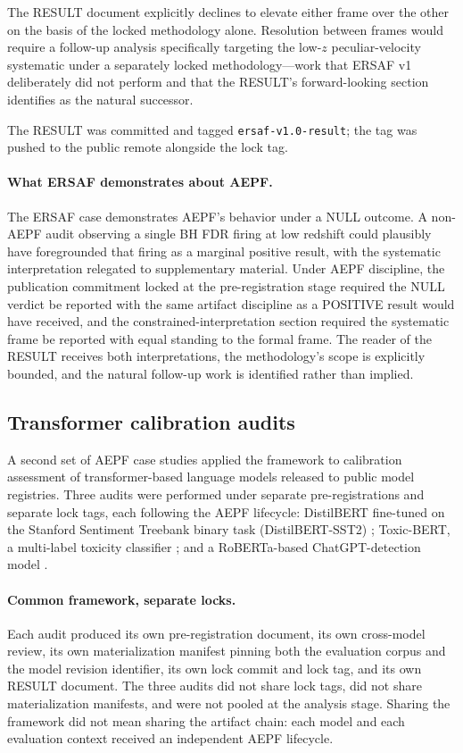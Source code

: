 \documentclass[11pt]{article}
\begin{document}
The RESULT document explicitly declines to elevate either frame
over the other on the basis of the locked methodology alone.
Resolution between frames would require a follow-up analysis
specifically targeting the low-$z$ peculiar-velocity systematic
under a separately locked methodology---work that ERSAF v1
deliberately did not perform and that the RESULT's forward-looking
section identifies as the natural successor.

The RESULT was committed and tagged \texttt{ersaf-v1.0-result};
the tag was pushed to the public remote alongside the lock tag.

\paragraph{What ERSAF demonstrates about AEPF.}
The ERSAF case demonstrates AEPF's behavior under a NULL outcome.
A non-AEPF audit observing a single BH FDR firing at low redshift
could plausibly have foregrounded that firing as a marginal
positive result, with the systematic interpretation relegated to
supplementary material. Under AEPF discipline, the publication
commitment locked at the pre-registration stage required the NULL
verdict be reported with the same artifact discipline as a
POSITIVE result would have received, and the constrained-interpretation
section required the systematic frame be reported with equal
standing to the formal frame. The reader of the RESULT receives
both interpretations, the methodology's scope is explicitly
bounded, and the natural follow-up work is identified rather than
implied.

\subsection{Transformer calibration audits}
\label{subsec:calibration-case}

A second set of AEPF case studies applied the framework to
calibration assessment of transformer-based language models
released to public model registries. Three audits were performed
under separate pre-registrations and separate lock tags, each
following the AEPF lifecycle: DistilBERT fine-tuned on the
Stanford Sentiment Treebank binary task (DistilBERT-SST2)
\cite{dixon2026distilbert}; Toxic-BERT, a multi-label toxicity
classifier \cite{dixon2026toxicbert}; and a RoBERTa-based
ChatGPT-detection model \cite{dixon2026chatgptdetector}.

\paragraph{Common framework, separate locks.}
Each audit produced its own pre-registration document, its own
cross-model review, its own materialization manifest pinning both
the evaluation corpus and the model revision identifier, its own
lock commit and lock tag, and its own RESULT document. The three
audits did not share lock tags, did not share materialization
manifests, and were not pooled at the analysis stage. Sharing the
framework did not mean sharing the artifact chain: each model and
each evaluation context received an independent AEPF lifecycle.
\end{document}
